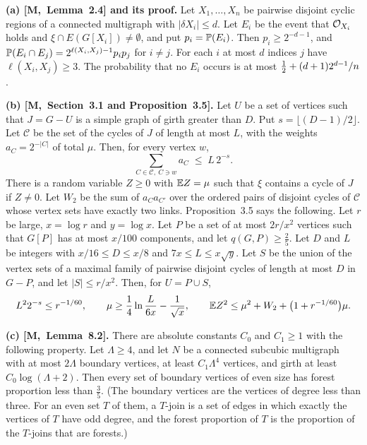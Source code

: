 \documentclass[11pt]{article}
\newcommand{\M}[1]{[M,~#1]}
\begin{document}
\begin{fineprint}
\textbf{(a) \M{Lemma~2.4} and its proof.} Let $X_1,\dots,X_n$ be pairwise disjoint cyclic regions
of a connected multigraph with $|\delta X_i|\le d$. Let $E_i$ be the event that $\mathcal{O}_{X_i}$ holds
and $\xi\cap E(G[X_i])\ne\emptyset$, and put $p_i=\mathbb{P}(E_i)$. Then $p_i\ge2^{-d-1}$, and
$\mathbb{P}(E_i\cap E_j)=2^{\ell(X_i,X_j)-1}p_ip_j$ for $i\ne j$. For each $i$ at most $d$ indices $j$
have $\ell(X_i,X_j)\ge3$. The probability that no $E_i$ occurs is at most
$\tfrac12+(d+1)2^{d-1}/n$.

\smallskip
\textbf{(b) \M{Section~3.1 and Proposition~3.5}.} Let $U$ be a set of vertices such that $J=G-U$
is a simple graph of girth greater than $D$. Put $s=\lfloor(D-1)/2\rfloor$. Let $\mathcal C$ be
the set of the cycles of $J$ of length at most $L$, with the weights $a_C=2^{-|C|}$ of total
$\mu$. Then, for every vertex $w$,
\begin{equation}\label{eq:load}
  \sum_{C\in\mathcal C,\ C\ni w}a_C\;\le\;L\,2^{-s}.
\end{equation}
There is a random variable $Z\ge0$ with $\mathbb{E} Z=\mu$ such that $\xi$ contains a cycle of $J$ if
$Z\ne0$. Let $W_2$ be the sum of $a_Ca_{C'}$ over the ordered pairs of disjoint cycles of
$\mathcal C$ whose vertex sets have exactly two links. Proposition~3.5 says the following. Let $r$
be large, $x=\log r$ and $y=\log x$. Let $P$ be a set of at most $2r/x^{2}$ vertices such that
$G[P]$ has at most $x/100$ components, and let $q(G,P)\ge\frac25$. Let $D$ and $L$ be integers
with $x/16\le D\le x/8$ and $7x\le L\le x\sqrt y$. Let $S$ be the union of the vertex sets of a
maximal family of pairwise disjoint cycles of length at most $D$ in $G-P$, and let
$|S|\le r/x^{2}$. Then, for $U=P\cup S$,
\[
  L^{2}2^{-s}\le r^{-1/60},\qquad \mu\ge\frac14\ln\frac{L}{6x}-\frac1{\sqrt x},\qquad
  \mathbb{E} Z^{2}\le\mu^{2}+W_2+\bigl(1+r^{-1/60}\bigr)\mu .
\]

\smallskip
\textbf{(c) \M{Lemma~8.2}.} There are absolute constants $C_0$ and $C_1\ge1$ with the following
property. Let $\Lambda\ge4$, and let $N$ be a connected subcubic multigraph with at most
$2\Lambda$ boundary vertices, at least $C_1\Lambda^{4}$ vertices, and girth at least
$C_0\log(\Lambda+2)$. Then every set of boundary vertices of even size has forest proportion less
than $\frac35$. (The boundary vertices are the vertices of degree less than three. For an even
set $T$ of them, a $T$-join is a set of edges in which exactly the vertices of $T$ have odd
degree, and the forest proportion of $T$ is the proportion of the $T$-joins that are forests.)


\end{fineprint}
\end{document}

